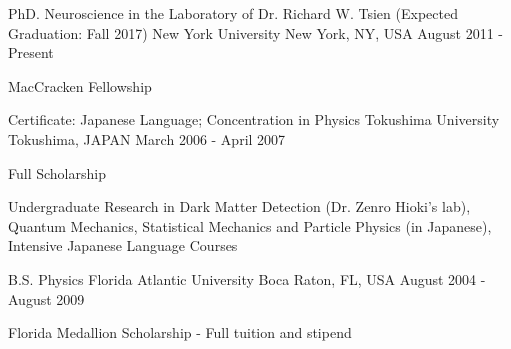 


\begin{cventries}



\cventry
{PhD. Neuroscience in the Laboratory of Dr. Richard W. Tsien (Expected Graduation: Fall 2017) } %
{New York University} %
{New York, NY, USA} %
{August 2011 - Present} %
{ %
\begin{cvitems}
\item {MacCracken Fellowship}
\end{cvitems}
}
\cventry
{Certificate: Japanese Language; Concentration in Physics} %
{Tokushima University} %
{Tokushima, JAPAN} %
{March 2006 - April 2007} %
{ %
\begin{cvitems}
\item {Full Scholarship}
\item {Undergraduate Research in Dark Matter Detection (Dr. Zenro Hioki's lab), Quantum Mechanics, Statistical Mechanics and Particle Physics (in Japanese), Intensive Japanese Language Courses}
\end{cvitems}
}
\cventry
{B.S. Physics} %
{Florida Atlantic University} %
{Boca Raton, FL, USA} %
{August 2004 - August 2009} %
{ %
\begin{cvitems}
\item {Florida Medallion Scholarship - Full tuition and stipend}
\end{cvitems}
}


\end{cventries}
